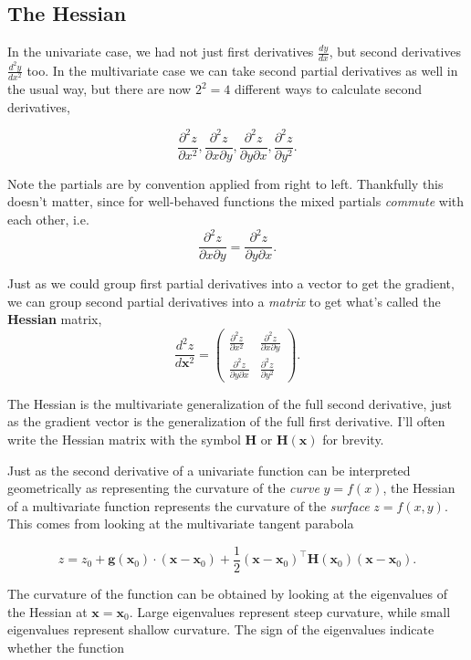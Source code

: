 \documentclass[
  letterpaper,
  DIV=11,
  numbers=noendperiod]{scrreprt}
\begin{document}
\hypertarget{the-hessian}{%
\subsection{The Hessian}\label{the-hessian}}

In the univariate case, we had not just first derivatives
\(\frac{dy}{dx}\), but second derivatives \(\frac{d^2y}{dx^2}\) too. In
the multivariate case we can take second partial derivatives as well in
the usual way, but there are now \(2^2=4\) different ways to calculate
second derivatives,

\[\frac{\partial^2 z}{\partial x^2}, \frac{\partial^2 z}{\partial x \partial y}, \frac{\partial^2 z}{\partial y \partial x}, \frac{\partial^2 z}{\partial y^2}.\]

Note the partials are by convention applied from right to left.
Thankfully this doesn't matter, since for well-behaved functions the
mixed partials \emph{commute} with each other, i.e.
\[\frac{\partial^2 z}{\partial x \partial y} = \frac{\partial^2 z}{\partial y \partial x}.\]

Just as we could group first partial derivatives into a vector to get
the gradient, we can group second partial derivatives into a
\emph{matrix} to get what's called the \textbf{Hessian} matrix, \[
\frac{d^2 z}{d\mathbf{x}^2} = 
\begin{pmatrix} 
\frac{\partial^2 z}{\partial x^2} & \frac{\partial^2 z}{\partial x \partial y} \\
\frac{\partial^2 z}{\partial y \partial x} & \frac{\partial^2 z}{\partial y^2}
\end{pmatrix}.
\]

The Hessian is the multivariate generalization of the full second
derivative, just as the gradient vector is the generalization of the
full first derivative. I'll often write the Hessian matrix with the
symbol \(\mathbf{H}\) or \(\mathbf{H}(\mathbf{x})\) for brevity.

Just as the second derivative of a univariate function can be
interpreted geometrically as representing the curvature of the
\emph{curve} \(y=f(x)\), the Hessian of a multivariate function
represents the curvature of the \emph{surface} \(z=f(x,y)\). This comes
from looking at the multivariate tangent parabola

\[z = z_0 + \mathbf{g}(\mathbf{x}_0) \cdot (\mathbf{x} - \mathbf{x}_0) + \frac{1}{2}(\mathbf{x} - \mathbf{x}_0)^\top \mathbf{H}(\mathbf{x}_0) (\mathbf{x} - \mathbf{x}_0).\]

The curvature of the function can be obtained by looking at the
eigenvalues of the Hessian at \(\mathbf{x}= \mathbf{x}_0\). Large
eigenvalues represent steep curvature, while small eigenvalues represent
shallow curvature. The sign of the eigenvalues indicate whether the
function
\end{document}

